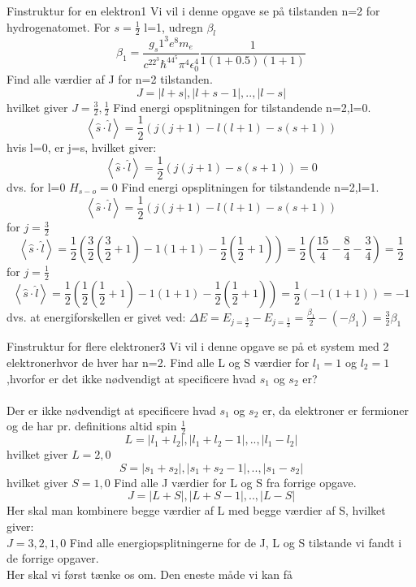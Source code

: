 \begin{opgave}{Finstruktur for en elektron}{1}
Vi vil i denne opgave se på tilstanden n=2 for hydrogenatomet.
\opg For $s=\frac{1}{2}$ l=1, udregn $\beta_l$
$$\beta_1=\frac{g_s1^3e^8m_e}{c^22^3\hbar^44^5\pi^4\epsilon_0^4}\frac{1}{1(1+0.5)(1+1)}$$
\opg Find alle værdier af J for n=2 tilstanden.
$$J=|l+s|,|l+s-1|,..,|l-s|$$
hvilket giver $J=\frac{3}{2},\frac{1}{2}$
\opg Find energi opsplitningen for tilstandende n=2,l=0.
$$\left<\hat{s}\cdot\hat{l}\right>=\frac{1}{2}(j(j+1)-l(l+1)-s(s+1))$$
hvis l=0, er j=s, hvilket giver:
$$\left<\hat{s}\cdot\hat{l}\right>=\frac{1}{2}(j(j+1)-s(s+1))=0$$
dvs. for l=0 $H_{s-o}=0$
\opg Find energi opsplitningen for tilstandende n=2,l=1.
$$\left<\hat{s}\cdot\hat{l}\right>=\frac{1}{2}(j(j+1)-l(l+1)-s(s+1))$$
for $j=\frac{3}{2}$
$$\left<\hat{s}\cdot\hat{l}\right>=\frac{1}{2}(\frac{3}{2}(\frac{3}{2}+1)-1(1+1)-\frac{1}{2}(\frac{1}{2}+1))=\frac{1}{2}(\frac{15}{4}-\frac{8}{4}-\frac{3}{4})=\frac{1}{2}$$
for $j=\frac{1}{2}$
$$\left<\hat{s}\cdot\hat{l}\right>=\frac{1}{2}(\frac{1}{2}(\frac{1}{2}+1)-1(1+1)-\frac{1}{2}(\frac{1}{2}+1))=\frac{1}{2}(-1(1+1))=-1$$
dvs. at energiforskellen er givet ved:
$\Delta E=E_{j=\frac{3}{2}}-E_{j=\frac{1}{2}}=\frac{\beta_1}{2}-(-\beta_1)=\frac{3}{2}\beta_1$
\end{opgave}

\begin{opgave}{Finstruktur for flere elektroner}{3}
Vi vil i denne opgave se på et system med 2 elektronerhvor de hver har n=2.
\opg Find alle L og S værdier for $l_1=1$ og $l_2=1$,hvorfor er det ikke nødvendigt at specificere hvad $s_1$ og $s_2$ er?\\
\\
Der er ikke nødvendigt at specificere hvad $s_1$ og $s_2$ er, da elektroner er fermioner og de har pr. definitions altid spin $\frac{1}{2}$
$$L=|l_1+l_2|,|l_1+l_2-1|,..,|l_1-l_2|$$
hvilket giver $L=2,0$
$$S=|s_1+s_2|,|s_1+s_2-1|,..,|s_1-s_2|$$
hvilket giver $S=1,0$
\opg Find alle J værdier for L og S fra forrige opgave.
$$J=|L+S|,|L+S-1|,..,|L-S|$$
Her skal man kombinere begge værdier af L med begge værdier af S, hvilket giver:\\
$J=3,2,1,0$
\opg Find alle energiopsplitningerne for de J, L og S tilstande vi fandt i de forrige opgaver.\\
Her skal vi først tænke os om. Den eneste måde vi kan få
\end{opgave}